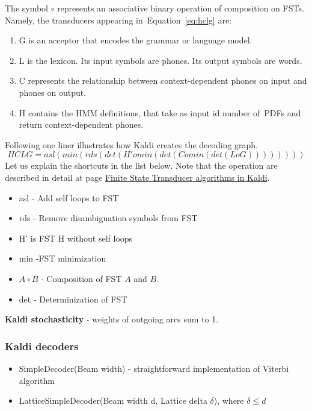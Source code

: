 The symbol $\circ$ represents an associative binary operation of composition on \acp{FST}.
Namely, the transducers appearing in~Equation~\ref{eq:hclg} are:
\begin{enumerate}
    \item G is an acceptor that encodes the grammar or language model.
    \item L is the lexicon. Its input symbols are phones. Its output symbols are words.
    \item C represents the relationship between context-dependent phones on input and phones on output.
    \item H contains the \ac{HMM} definitions, that take as input id number of~\acp{PDF} and return context-dependent phones.
\end{enumerate}

Following one liner illustrates how Kaldi creates the decoding graph. 
\begin{equation}
   HCLG = asl(min(rds(det(H' o min(det(C o min(det(L o G)))))))) 
\end{equation}
Let us explain the shortcuts in the list below. Note that the operation are described in detail
at page \href{http://kaldi.sourceforge.net/fst_algo.html#fst_algo_stochastic} {Finite State Transducer algorithms in Kaldi}. 
\begin{itemize}
    \item asl - Add self loops to \ac{FST}
    \item rds - Remove disambiguation symbols from \ac{FST}
    \item H' is \ac{FST} H without self loops
    \item min -\ac{FST} minimization
    \item $A\circ B$  - Composition of \ac{FST} $A$ and $B$.
    \item det - Determinization of \ac{FST}
\end{itemize}

{\bf Kaldi stochasticity} - weights of outgoing arcs sum to 1.


\subsubsection*{Kaldi decoders} %
\begin{itemize}
    \item SimpleDecoder(Beam width) - straightforward implementation of Viterbi algorithm
    \item LatticeSimpleDecoder(Beam width d, Lattice delta $\delta$), where $ \delta \le d$

\end{itemize}



